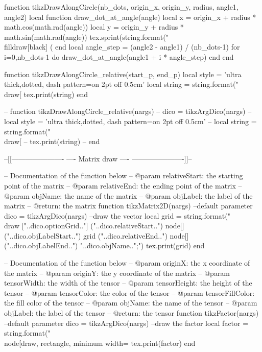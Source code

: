 \begin{luacode*}
	function tikzDrawAlongCircle(nb_dots, origin_x, origin_y, radius, angle1, angle2)
	  local function draw_dot_at_angle(angle)
		local x = origin_x + radius * math.cos(math.rad(angle))
		local y = origin_y + radius * math.sin(math.rad(angle))
		tex.sprint(string.format("\\filldraw[black] (%
	  end
	  local angle_step = (angle2 - angle1) / (nb_dots-1)
	  for i=0,nb_dots-1 do
		draw_dot_at_angle(angle1 + i * angle_step)
	  end
	end
  
	function tikzDrawAlongCircle_relative(start_p, end_p)
	  local style = 'ultra thick,dotted, dash pattern=on 2pt off 0.5cm'
	  local string = string.format("\\draw[%
	  tex.print(string)
	end

	-- function tikzDrawAlongCircle_relative(nargs)
	--   dico = tikzArgDico(nargs)
	--   local style = 'ultra thick,dotted, dash pattern=on 2pt off 0.5cm'
	--   local string = string.format("\\draw[%
	--   tex.print(string)
	-- end
  
	--[[----------------------
	----    Matrix draw   ----
	----------------------]]--

	-- Documentation of the function below
	-- @param relativeStart: the starting point of the matrix
	-- @param relativeEnd: the ending point of the matrix
	-- @param objName: the name of the matrix
	-- @param objLabel: the label of the matrix
	-- @return: the matrix
	function tikzMatrix2D(nargs)
	  --default parameter
	  dico = tikzArgDico(nargs)
	  --draw the vector
	  local grid = string.format("\\draw ["..dico.optionGrid.."] ("..dico.relativeStart..") node[] ("..dico.objLabelStart..") {} grid ("..dico.relativeEnd..") node[] ("..dico.objLabelEnd..") {"..dico.objName.."};")
	  tex.print(grid)
	end

	-- Documentation of the function below
	-- @param originX: the x coordinate of the matrix
	-- @param originY: the y coordinate of the matrix
	-- @param tensorWidth: the width of the tensor
	-- @param tensorHeight: the height of the tensor
	-- @param tensorColor: the color of the tensor
	-- @param tensorFillColor: the fill color of the tensor
	-- @param objName: the name of the tensor
	-- @param objLabel: the label of the tensor
	-- @return: the tensor
	function tikzFactor(nargs)
	  --default parameter
	  dico = tikzArgDico(nargs)
	  --draw the factor
	  local factor = string.format("\\node[draw, rectangle, minimum width=%
	  tex.print(factor)
	end


\end{luacode*}
